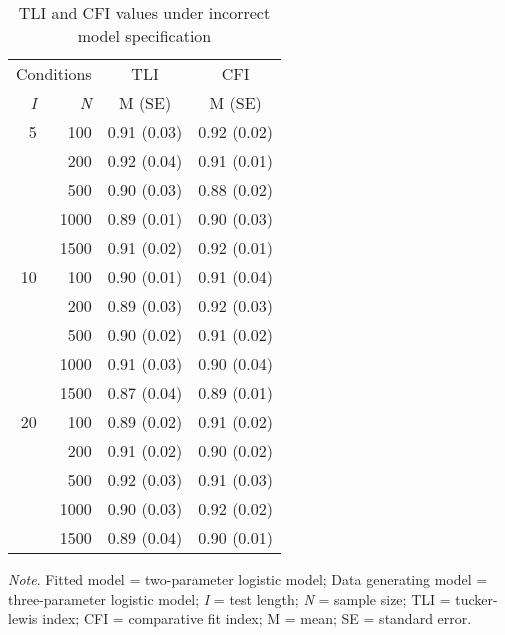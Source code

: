 \documentclass[Royal,sageapa,times,doublespace]{sagej}
\begin{document}
\begin{table}[ht]
\caption{TLI and CFI values under incorrect model specification}
\begin{tabular}{ r r | c c }
\toprule
\multicolumn{2}{c}{Conditions} & \multicolumn{1}{c}{TLI} & \multicolumn{1}{c}{CFI} \\
\textit{I} & \textit{N} & M (SE) & M (SE) \\
\midrule
 5 & 100 & 0.91 (0.03) & 0.92 (0.02) \\
& 200 & 0.92 (0.04) & 0.91 (0.01) \\
& 500 & 0.90 (0.03) & 0.88 (0.02) \\
& 1000 & 0.89 (0.01) & 0.90 (0.03)\\
& 1500 & 0.91 (0.02) & 0.92 (0.01)\\
10 & 100 & 0.90 (0.01) & 0.91 (0.04)\\
& 200 & 0.89 (0.03) & 0.92 (0.03)\\
& 500 & 0.90 (0.02) & 0.91 (0.02)\\
& 1000 & 0.91 (0.03) & 0.90 (0.04)\\
& 1500 & 0.87 (0.04) & 0.89 (0.01)\\
20 & 100 & 0.89 (0.02) & 0.91 (0.02)\\
& 200 & 0.91 (0.02) & 0.90 (0.02) \\
& 500 & 0.92 (0.03) & 0.91 (0.03)\\
& 1000 & 0.90 (0.03) & 0.92 (0.02)\\
& 1500 & 0.89 (0.04)& 0.90 (0.01)\\
\bottomrule
\end{tabular}

\bigskip
\small\textit{Note}. Fitted model = two-parameter logistic model; Data generating model = three-parameter logistic model; \textit{I} = test length; \textit{N} = sample size; TLI = tucker-lewis index; CFI = comparative fit index; M = mean; SE = standard error.
\label{tab:5}
\end{table}

\newpage

%
%
%
%
%

\newpage

\nocite{*}


\end{document}
